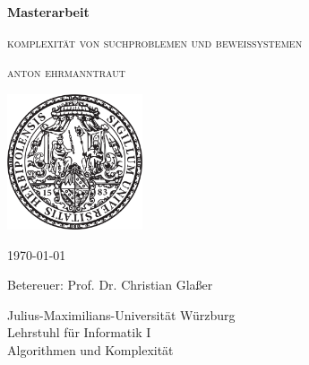 \pagestyle{empty}

\begin{center}{

\vspace*{2cm}

{\large\textbf{Masterarbeit}}\par
    \vspace*{1cm}
{\LARGE\textsc{komplexität von suchproblemen und beweissystemen}}\par
    \vspace*{.3cm}
{\large\textsc{anton ehrmanntraut}}\par}
\vspace*{5cm}

\includegraphics[width=4cm]{siegel.pdf}

\vspace*{2cm}


{\large\today}\vspace*{.9cm}

{\large Betereuer: Prof. Dr. Christian Glaßer}\vspace*{.5cm}


{\large
Julius-Maximilians-Universität Würzburg\\
Lehrstuhl für Informatik I\\
Algorithmen und Komplexität\\
}


\end{center}

\cleardoublepage
\restoregeometry

\tableofcontents
\thispagestyle{empty}
\cleardoublepage
{}
\pagestyle{main}

